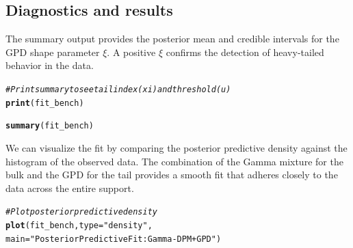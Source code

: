 \documentclass[article]{jss}\usepackage[]{graphicx}\usepackage[]{xcolor}
\makeatletter
\newcommand{\hlsng}[1]{\textcolor[rgb]{0.192,0.494,0.8}{#1}}%
\newcommand{\hlcom}[1]{\textcolor[rgb]{0.678,0.584,0.686}{\textit{#1}}}%
\newcommand{\hldef}[1]{\textcolor[rgb]{0.345,0.345,0.345}{#1}}%
\newcommand{\hlkwc}[1]{\textcolor[rgb]{0.333,0.667,0.333}{#1}}%
\newcommand{\hlkwd}[1]{\textcolor[rgb]{0.737,0.353,0.396}{\textbf{#1}}}%
\newenvironment{kframe}{%
 \def\at@end@of@kframe{}%
 \ifinner\ifhmode%
  \def\at@end@of@kframe{\end{minipage}}%
  \begin{minipage}{\columnwidth}%
 \fi\fi%
 \def\FrameCommand##1{\hskip\@totalleftmargin \hskip-\fboxsep
 \colorbox{shadecolor}{##1}\hskip-\fboxsep
     \hskip-\linewidth \hskip-\@totalleftmargin \hskip\columnwidth}%
 \MakeFramed {\advance\hsize-\width
   \@totalleftmargin\z@ \linewidth\hsize
   \@setminipage}}%
 {\par\unskip\endMakeFramed%
 \at@end@of@kframe}
\newenvironment{knitrout}{}{} %
\makeatother
\begin{document}
\subsection{Diagnostics and results}

The summary output provides the posterior mean and credible intervals for the GPD shape parameter $\xi$. A positive $\xi$ confirms the detection of heavy-tailed behavior in the data.

\begin{knitrout}
\color{fgcolor}\begin{kframe}
\begin{alltt}
\hlcom{# Print summary to see tail index (xi) and threshold (u)}
\hlkwd{print}\hldef{(fit_bench)}
\end{alltt}


{\ttfamily\noindent\bfseries\color{errorcolor}{\#\# Error:\\\#\# ! object 'fit\_bench' not found}}\begin{alltt}
\hlkwd{summary}\hldef{(fit_bench)}
\end{alltt}


{\ttfamily\noindent\bfseries\color{errorcolor}{\#\# Error:\\\#\# ! object 'fit\_bench' not found}}\end{kframe}
\end{knitrout}

We can visualize the fit by comparing the posterior predictive density against the histogram of the observed data. The combination of the Gamma mixture for the bulk and the GPD for the tail provides a smooth fit that adheres closely to the data across the entire support.

\begin{knitrout}
\color{fgcolor}\begin{kframe}
\begin{alltt}
\hlcom{# Plot posterior predictive density}
\hlkwd{plot}\hldef{(fit_bench,} \hlkwc{type} \hldef{=} \hlsng{"density"}\hldef{,}
     \hlkwc{main} \hldef{=} \hlsng{"Posterior Predictive Fit: Gamma-DPM + GPD"}\hldef{)}
\end{alltt}


{\ttfamily\noindent\bfseries\color{errorcolor}{\#\# Error:\\\#\# ! object 'fit\_bench' not found}}\end{kframe}
\end{knitrout}
\end{document}
